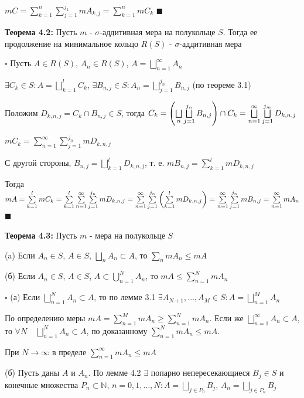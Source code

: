 \documentclass[a4paper]{report}
\newcommand*{\hm}[1]{#1\nobreak\discretionary{}%
            {\hbox{$\mathsurround=0pt #1$}}{}}
\begin{document}
$mC=\sum\limits_{k=1}^n\sum\limits_{j=1}^{j_k}mA_{k,j}=\sum\limits_{k=1}^n mC_k$ $\blacksquare$
\bigskip

\noindent\textbf{Теорема 4.2:} Пусть $m$ - $\sigma$-аддитивная мера на полукольце $S$. Тогда ее продолжение на минимальное
кольцо $R(S)$ - $\sigma$-аддитивная мера

\noindent $\square$ Пусть $A\in R(S)$, $A_n\in R(S)$, $A=\bigsqcup\limits_{n=1}^\infty A_n$

$\exists C_k\in S\colon A=\bigsqcup\limits_{k=1}^l C_k$, $\exists B_{n,j}\in S\colon A_n=\bigsqcup\limits_{j=1}^{j_n} B_{n,j}$
(по теореме 3.1)

Положим $D_{k,n,j}=C_k\cap B_{n,j}\in S$, тогда $C_k=\left(\bigsqcup\limits_n\bigsqcup\limits_{j=1}^{j_n} B_{n,j}\right)\cap C_k\hm=
\bigsqcup\limits_{n=1}^\infty\bigsqcup\limits_{j=1}^{j_m} D_{k,n,j}$

$mC_k=\sum\limits_{n=1}^\infty\sum\limits_{j=1}^{j_n}mD_{k,n,j}$

С другой стороны, $B_{n,j}=\bigsqcup\limits_{k=1}^l D_{k,n,j}$, т. е. $mB_{n,j}=\sum\limits_{k=1}^l mD_{k,n,j}$

Тогда $mA=\sum\limits_{k=1}^l mC_k=\sum\limits_{k=1}^l\sum\limits_{n=1}^\infty\sum\limits_{j=1}^{j_n} mD_{k,n,j}=
\sum\limits_{n=1}^\infty\sum\limits_{j=1}^{j_n}\left(\sum\limits_{k=1}^l mD_{k,n,j}\right)\hm=\sum\limits_{n=1}^\infty
\sum\limits_{j=1}^{j_n}mB_{n,j}=\sum\limits_{n=1}^\infty mA_n$ $\blacksquare$
\bigskip

\noindent\textbf{Теорема 4.3:} Пусть $m$ - мера на полукольце $S$

(a) Если $A_n\in S$, $A\in S$, $\bigsqcup\limits_n A_n\subset A$, то $\sum\limits_n mA_n\le mA$

(б) Если $A_n\in S$, $A\in S$, $A\subset\bigcup\limits_{n=1}^N A_n$, то $mA\le\sum\limits_{n=1}^N mA_n$

\noindent $\square$ (а) Если $\bigsqcup\limits_{n=1}^N A_n\subset A$, то по лемме 3.1 $\exists A_{N+1},\ldots,A_M\in S\colon
A=\bigsqcup\limits_{n=1}^M A_n$

По определению меры $mA=\sum\limits_{n=1}^M mA_n\ge\sum\limits_{n=1}^N mA_n$. Если же $\bigsqcup\limits_{n=1}^\infty A_n\subset
A$, то $\forall N\quad\bigsqcup\limits_{n=1}^N A_n\subset A$, по доказанному $\sum\limits_{n=1}^N mA_n\le mA$.

При $N\to\infty$ в пределе $\sum\limits_{n=1}^\infty mA_n\le mA$

(б) Пусть даны $A$ и $A_n$. По лемме 4.2 $\exists$ попарно непересекающиеся $B_j\in S$ и конечные множества $P_n\subset
\mathbb N$, $n=0,1,\ldots,N\colon A=\bigsqcup\limits_{j\in P_0}B_j$, $A_n=\bigsqcup\limits_{j\in P_n}B_j$
\end{document}
